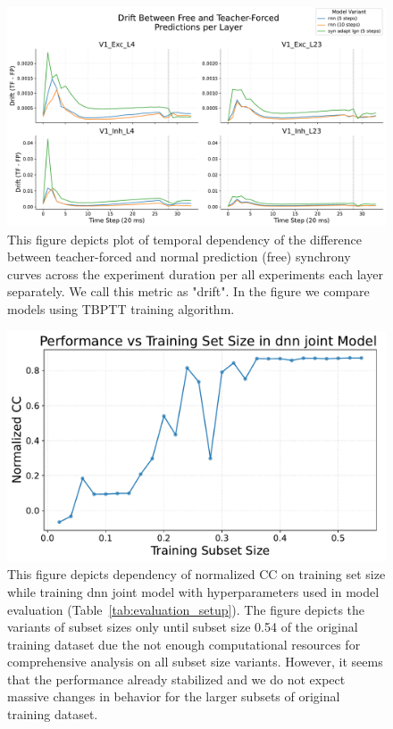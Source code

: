 \begin{figure}
    \centering
    \includegraphics[width=\linewidth]{img/plots/temporal_drift_forced_free.pdf}
    \caption{This figure depicts plot of temporal dependency of the difference between teacher-forced and normal prediction (free) synchrony curves across the experiment duration per all experiments each layer separately. We call this metric as "drift". In the figure we compare models using TBPTT training algorithm.}
    \label{fig:drift}
\end{figure}

\begin{figure}
    \centering
    \includegraphics[width=0.8\linewidth]{img/plots/train_size_performance_dependency.pdf}
    \caption{This figure depicts dependency of normalized CC on training set size while training dnn joint model with hyperparameters used in model evaluation (Table~\ref{tab:evaluation_setup}). The figure depicts the variants of subset sizes only until subset size 0.54 of the original training dataset due the not enough computational resources for comprehensive analysis on all subset size variants. However, it seems that the performance already stabilized and we do not expect massive changes in behavior for the larger subsets of original training dataset.}
    \label{fig:train_size_cc_norm_dependency}
\end{figure}


